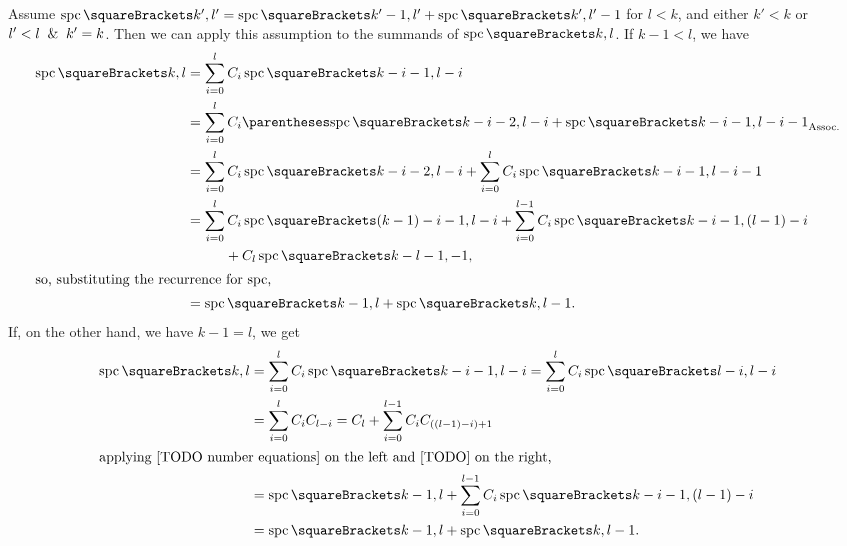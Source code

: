 \documentclass[10pt, a4paper, twoside]{basestyle}
\DeclareMathOperator{\spc}{spc}
\begin{document}
Assume $\spc\of{k',l'}=\spc\of{k'-1,l'}+\spc\of{k',l'-1}$ for $l<k$, and either $k'<k$ or $l'<l \And k'=k$.
Then we can apply this assumption to the summands of $\spc\of{k, l}$. If $k - 1 < l$, we have
\begin{align*}
\spc\of{k, l} &= \sum{i=0}[l]
C_{i}
\spc\of{k-i-1,l-i} \\
&= \sum{i=0}[l]
C_{i}
\pa{\spc\of{k-i-2,l-i}+\spc\of{k-i-1,l-i-1}} \\
&= \sum{i=0}[l]
C_{i}\spc\of{k-i-2,l-i}
+\sum{i=0}[l]C_{i}\spc\of{k-i-1,l-i-1} \\
&= \sum{i=0}[l]
C_{i}\spc\of{(k-1)-i-1,l-i}
+\sum{i=0}[l-1]C_{i}\spc\of{k-i-1,(l-1)-i} \\&\phantom{=}\qquad + C_{l}\spc\of{k-l-1,-1}\text, \\
\intertext{so, substituting the recurrence for $\spc$,}
&= \spc\of{k-1, l} + \spc\of{k,l-1}\text.
\end{align*}
If, on the other hand, we have $k - 1 = l$, we get
\begin{align*}
\spc\of{k, l}
&= \sum{i=0}[l]C_{i}\spc\of{k-i-1,l-i} = \sum{i=0}[l]C_{i}\spc\of{l-i,l-i}\\
&= \sum{i=0}[l]C_{i}C_{l-i} = C_l + \sum{i=0}[l-1]C_{i}C_{((l-1)-i)+1} \\
\intertext{applying [TODO number equations] on the left and [TODO] on the right,}
&= \spc\of{k-1, l} + \sum{i=0}[l-1]C_{i}\spc\of{k-i-1,(l-1)-i} \\
&= \spc\of{k-1, l} + \spc\of{k,l-1}\text.
\end{align*}



\clearpage
\nocite{*}


\end{document}

